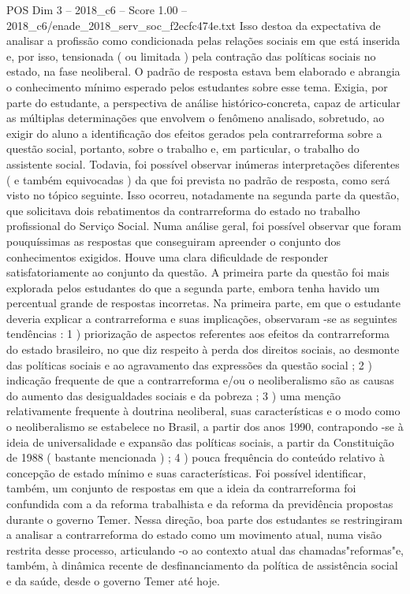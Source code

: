 \begin{textsample}{POS Dim 3 – 2018\_c6 – Score 1.00 – 2018\_c6/enade\_2018\_serv\_soc\_f2ecfc474e.txt}
Isso destoa da expectativa de analisar a profissão como condicionada pelas relações sociais em que está inserida e, por isso, tensionada ( ou limitada ) pela contração das políticas sociais no estado, na fase neoliberal.
O padrão de resposta estava bem elaborado e abrangia o conhecimento mínimo esperado pelos estudantes sobre esse tema.
Exigia, por parte do estudante, a perspectiva de análise histórico-concreta, capaz de articular as múltiplas determinações que envolvem o fenômeno analisado, sobretudo, ao exigir do aluno a identificação dos efeitos gerados pela contrarreforma sobre a questão social, portanto, sobre o trabalho e, em particular, o trabalho do assistente social.
Todavia, foi possível observar inúmeras interpretações diferentes ( e também equivocadas ) da que foi prevista no padrão de resposta, como será visto no tópico seguinte.
Isso ocorreu, notadamente na segunda parte da questão, que solicitava dois rebatimentos da contrarreforma do estado no trabalho profissional do Serviço Social.
Numa análise geral, foi possível observar que foram pouquíssimas as respostas que conseguiram apreender o conjunto dos conhecimentos exigidos.
Houve uma clara dificuldade de responder satisfatoriamente ao conjunto da questão.
A primeira parte da questão foi mais explorada pelos estudantes do que a segunda parte, embora tenha havido um percentual grande de respostas incorretas.
Na primeira parte, em que o estudante deveria explicar a contrarreforma e suas implicações, observaram -se as seguintes tendências : 1 ) priorização de aspectos referentes aos efeitos da contrarreforma do estado brasileiro, no que diz respeito à perda dos direitos sociais, ao desmonte das políticas sociais e ao agravamento das expressões da questão social ; 2 ) indicação frequente de que a contrarreforma e/ou o neoliberalismo são as causas do aumento das desigualdades sociais e da pobreza ; 3 ) uma menção relativamente frequente à doutrina neoliberal, suas características e o modo como o neoliberalismo se estabelece no Brasil, a partir dos anos 1990, contrapondo -se à ideia de universalidade e expansão das políticas sociais, a partir da Constituição de 1988 ( bastante mencionada ) ; 4 ) pouca frequência do conteúdo relativo à concepção de estado mínimo e suas características.
Foi possível identificar, também, um conjunto de respostas em que a ideia da contrarreforma foi confundida com a da reforma trabalhista e da reforma da previdência propostas durante o governo Temer.
Nessa direção, boa parte dos estudantes se restringiram a analisar a contrarreforma do estado como um movimento atual, numa visão restrita desse processo, articulando -o ao contexto atual das chamadas"reformas"e, também, à dinâmica recente de desfinanciamento da política de assistência social e da saúde, desde o governo Temer até hoje.

\end{textsample}
